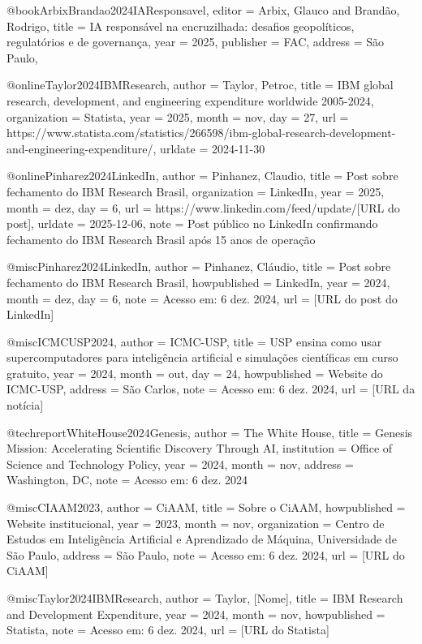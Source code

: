{@book{ArbixBrandao2024IAResponsavel,
  editor = {Arbix, Glauco and Brandão, Rodrigo},
  title = {IA responsável na encruzilhada: desafios geopolíticos, regulatórios e de governança},
  year = {2025},
  publisher = {FAC},
  address = {São Paulo},
}

@online{Taylor2024IBMResearch,
  author = {Taylor, Petroc},
  title = {IBM global research, development, and engineering expenditure worldwide 2005-2024},
  organization = {Statista},
  year = {2025},
  month = {nov},
  day = {27},
  url = {https://www.statista.com/statistics/266598/ibm-global-research-development-and-engineering-expenditure/},
  urldate = {2024-11-30}
}

@online{Pinharez2024LinkedIn,
  author = {Pinhanez, Claudio},
  title = {Post sobre fechamento do IBM Research Brasil},
  organization = {LinkedIn},
  year = {2025},
  month = {dez},
  day = {6},
  url = {https://www.linkedin.com/feed/update/[URL do post]},
  urldate = {2025-12-06},
  note = {Post público no LinkedIn confirmando fechamento do IBM Research Brasil após 15 anos de operação}
}

@misc{Pinharez2024LinkedIn,
  author = {Pinhanez, Cláudio},
  title = {Post sobre fechamento do {IBM} Research Brasil},
  howpublished = {LinkedIn},
  year = {2024},
  month = {dez},
  day = {6},
  note = {Acesso em: 6 dez. 2024},
  url = {[URL do post do LinkedIn]}
}

@misc{ICMCUSP2024,
  author = {{ICMC-USP}},
  title = {{USP} ensina como usar supercomputadores para inteligência artificial e simulações científicas em curso gratuito},
  year = {2024},
  month = {out},
  day = {24},
  howpublished = {Website do ICMC-USP},
  address = {São Carlos},
  note = {Acesso em: 6 dez. 2024},
  url = {[URL da notícia]}
}

@techreport{WhiteHouse2024Genesis,
  author = {{The White House}},
  title = {Genesis Mission: Accelerating Scientific Discovery Through {AI}},
  institution = {Office of Science and Technology Policy},
  year = {2024},
  month = {nov},
  address = {Washington, DC},
  note = {Acesso em: 6 dez. 2024}
}

@misc{CIAAM2023,
  author = {{CiAAM}},
  title = {Sobre o {CiAAM}},
  howpublished = {Website institucional},
  year = {2023},
  month = {nov},
  organization = {Centro de Estudos em Inteligência Artificial e Aprendizado de Máquina, Universidade de São Paulo},
  address = {São Paulo},
  note = {Acesso em: 6 dez. 2024},
  url = {[URL do CiAAM]}
}

@misc{Taylor2024IBMResearch,
  author = {Taylor, [Nome]},
  title = {{IBM} Research and Development Expenditure},
  year = {2024},
  month = {nov},
  howpublished = {Statista},
  note = {Acesso em: 6 dez. 2024},
  url = {[URL do Statista]}
}

}
